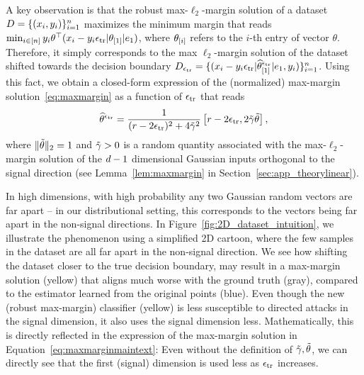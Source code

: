 A key observation is that the robust max-$\ell_2$-margin solution of a
dataset $D= \{(x_i, y_i)\}_{i=1}^n$ 
maximizes the minimum margin that reads ${\min_{i\in [n]}
  y_i \theta^\top (x_i - y_i \epsilon_{\text{tr}} |\theta_{[1]}| e_1)}$, where
${\theta}_{[i]}$ refers to the $i$-th entry of vector $\theta$. Therefore, it
simply corresponds to the max $\ell_2$-margin solution of the dataset
shifted towards the decision boundary ${D_{\epsilon_{\text{tr}}} = \{(x_i - y_i \epsilon_{\text{tr}}
  |{\widehat{\theta}^{\epsilon_{\text{tr}}}}_{[1]}| e_1, y_i)\}_{i=1}^n}$.
Using this fact, we obtain 
a closed-form expression of the (normalized) max-margin solution~\eqref{eq:maxmargin} as a function of
$\epsilon_{\text{tr}}$ that reads
\begin{equation}
  \label{eq:maxmarginmaintext}
\widehat{\theta}^{\epsilon_{\text{tr}}} = \frac{1}{(r-2\epsilon_{\text{tr}})^2 + 4 \tilde{\gamma}^2}
\left[r - 2\epsilon_{\text{tr}}, 2 \tilde{\gamma} \tilde{\theta} \right],
\end{equation} 
where $\|\tilde{\theta}\|_2 = 1$ and $\tilde{\gamma} >0$ is a random quantity
associated with the max-$\ell_2$-margin solution of the
$d-1$ dimensional Gaussian inputs orthogonal
to the signal direction
(see Lemma~\ref{lem:maxmargin} in Section~\ref{sec:app_theorylinear}).

In high dimensions, with high probability any two
Gaussian random vectors are far apart -- in our
distributional setting, this corresponds to the vectors being far
apart in the non-signal directions. In
Figure~\ref{fig:2D_dataset_intuition}, we illustrate the phenomenon
using a simplified 2D cartoon, where the few samples
in the dataset are all far apart in the non-signal direction.
We see how shifting the dataset closer to the true decision boundary,
may result in a max-margin solution (yellow) that aligns much worse
with the ground truth (gray), compared to the estimator learned from
the original points (blue). Even though the new (robust max-margin)
classifier (yellow) is less susceptible to directed attacks in the
signal dimension, it also uses the signal dimension less.
Mathematically, this is directly
reflected in the expression of the max-margin solution in
Equation~\eqref{eq:maxmarginmaintext}: Even without the definition of
$\tilde{\gamma}, \tilde{\theta}$, we can directly see that the first
(signal) dimension is used less as $\epsilon_{\text{tr}}$ increases.



